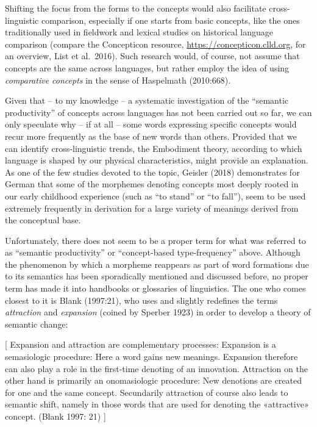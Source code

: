 \documentclass[
  english,
  a4paper,
  oneside,tablecaptionabove
]{scrbook}
\begin{document}
Shifting the focus from the forms to the concepts would also facilitate
cross-linguistic comparison, especially if one starts from basic
concepts, like the ones traditionally used in fieldwork and lexical
studies on historical language comparison (compare the Concepticon
resource,
\href{https://concepticon.clld.org/}{https://concepticon.clld.org}, for
an overview, List et al.~2016). Such research would, of course, not
assume that concepts are the same across languages, but rather employ
the idea of using \emph{comparative concepts} in the sense of Haspelmath
(2010:668).

Given that -- to my knowledge -- a systematic investigation of the
\enquote{semantic productivity} of concepts across languages has not
been carried out so far, we can only speculate why -- if at all -- some
words expressing specific concepts would recur more frequently as the
base of new words than others. Provided that we can identify
cross-linguistic trends, the Embodiment theory, according to which
language is shaped by our physical characteristics, might provide an
explanation. As one of the few studies devoted to the topic, Geisler
(2018) demonstrates for German that some of the morphemes denoting
concepts most deeply rooted in our early childhood experience (such as
\enquote{to stand} or \enquote{to fall}), seem to be used extremely
frequently in derivation for a large variety of meanings derived from
the conceptual base.

Unfortunately, there does not seem to be a proper term for what was
referred to as \enquote{semantic productivity} or \enquote{concept-based
type-frequency} above. Although the phenomenon by which a morpheme
reappears as part of word formations due to its semantics has been
sporadically mentioned and discussed before, no proper term has made it
into handbooks or glossaries of linguistics. The one who comes closest
to it is Blank (1997:21), who uses and slightly redefines the terms
\emph{attraction} and \emph{expansion} (coined by Sperber 1923) in order
to develop a theory of semantic change:

{[} Expansion and attraction are complementary processes: Expansion is a
semasiologic procedure: Here a word gains new meanings. Expansion
therefore can also play a role in the first-time denoting of an
innovation. Attraction on the other hand is primarily an onomasiologic
procedure: New denotions are created for one and the same concept.
Secundarily attraction of course also leads to semantic shift, namely in
those words that are used for denoting the «attractive» concept. (Blank
1997: 21) {]}
\end{document}
